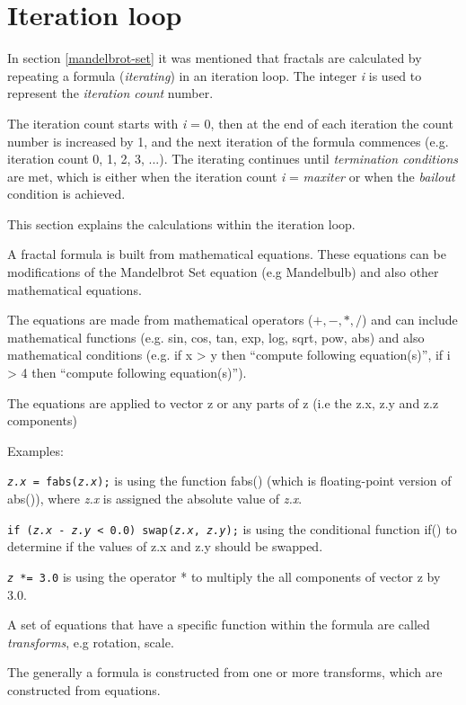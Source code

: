 \section{Iteration loop}\label{iteration-loop}

In section \ref{mandelbrot-set} it was mentioned that fractals are calculated
by repeating a formula (\emph{iterating}) in an iteration loop. 
The integer \emph{i} is used to represent the \emph{iteration count} number.

The iteration count starts with \emph{i} = 0, then at the end of each iteration the
count number is increased by 1, and the next iteration of the formula commences 
(e.g. iteration count  0, 1, 2, 3, ...). The iterating continues until \emph{termination conditions} are met, 
which is either when the iteration count \emph{i} =  \emph{maxiter} or when the \emph{bailout} condition is achieved. 

This section explains the calculations within the iteration loop.

A fractal formula is built from mathematical equations. 
These equations can be modifications of the Mandelbrot Set equation (e.g Mandelbulb) and also other mathematical equations.

The equations are made from mathematical operators ($+, -, *, /$) 
and can include mathematical functions (e.g. sin, cos, tan, exp, log, sqrt, pow, abs) 
and also mathematical conditions (e.g. if x > y then ``compute following equation(s)'', if i > 4 then ``compute following equation(s)'').

The equations are applied to vector z or any parts of z (i.e the z.x, z.y and z.z components)

Examples:

{\tt\emph{z.x} = fabs(\emph{z.x});} is using the function fabs() (which is floating-point version of abs()), where \emph{z.x} is assigned the absolute value of \emph{z.x}.

{\tt if (\emph{z.x} - \emph{z.y} < 0.0) swap(\emph{z.x}, \emph{z.y});} is using the conditional function if() to determine if the values of z.x and z.y should be swapped.

{\tt \emph{z} *= 3.0} is using the operator * to multiply the all components of vector z by 3.0.

A set of equations that have a specific function within the formula are called \emph{transforms}, e.g rotation, scale.

The generally a formula is constructed from one or more transforms, which are constructed from equations.

